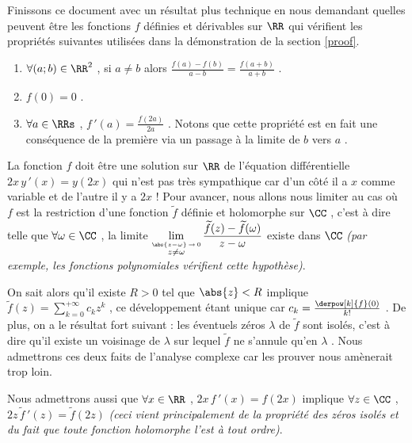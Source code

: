 Finissons ce document avec un résultat plus technique en nous demandant quelles peuvent être les fonctions $f$ définies et dérivables sur $\RR$ qui vérifient les propriétés suivantes utilisées dans la démonstration de la section \ref{proof}.
\begin{enumerate}
	\item $\forall (a ; b) \in \RR^2$ , si $a \neq b$ alors $\frac{f(a) - f(b)}{a - b} = \frac{f(a + b)}{a + b}$ .

	\item $f(0) = 0$ .

	\item $\forall a \in \RRs$ , $f\,'(a) = \frac{f(2 a)}{2 a}$ . Notons que cette propriété est en fait une conséquence de la première via un passage à la limite de $b$ vers $a$ .
\end{enumerate}


\medskip


La fonction $f$ doit être une solution sur $\RR$ de l'équation différentielle $2 x \, y\,'(x) = y(2x)$ qui n'est pas très sympathique car d'un côté il a $x$ comme variable et de l'autre il y a $2x$ !
Pour avancer, nous allons nous limiter au cas où $f$ est la restriction d'une fonction $\widetilde{f}$ définie et holomorphe sur $\CC$ , c'est à dire telle que $\forall \omega \in \CC$ , la limite $\displaystyle \lim_{\stackrel{\abs{z - \omega} \, \rightarrow \, 0}{z \neq \omega}} \frac{\widetilde{f}(z) - \widetilde{f}(\omega)}{z - \omega}$ existe dans $\CC$
\emph{(par exemple, les fonctions polynomiales vérifient cette hypothèse)}.


\medskip

On sait alors qu'il existe $R > 0$ tel que $\abs{z} < R$ implique
$\displaystyle \widetilde{f}(z) = \sum_{k = 0}^{+ \infty} c_k z^k$ , ce développement étant unique car $c_k = \frac{\derpow[k]{f}(0)}{k!}$ .
De plus, on a le résultat fort suivant : les éventuels zéros $\lambda$ de $\widetilde{f}$ sont isolés, c'est à dire qu'il existe un voisinage de $\lambda$ sur lequel $\widetilde{f}$ ne s'annule qu'en $\lambda$ . Nous admettrons ces deux faits de l'analyse complexe car les prouver nous amènerait trop loin.


\medskip

Nous admettrons aussi que $\forall x \in \RR$ , $2 x \, f\,'(x) = f(2x)$ implique $\forall z \in \CC$ , $2 z \, \widetilde{f}\,'(z) = \widetilde{f}(2z)$ \emph{(ceci vient principalement de la propriété des zéros isolés et du fait que toute fonction holomorphe l'est à tout ordre)}. 


